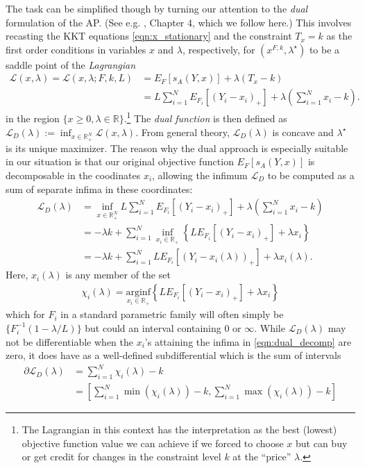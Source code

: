 \documentclass{article}
\begin{document}
The task can be simplified though by turning our attention to the \emph{dual} formulation of the AP. (See e.g. \cite{ruszczynski2011nonlinear}, Chapter 4, which we follow here.) This involves recasting the KKT equations \eqref{eqn:x_stationary}
and the constraint $T_x=k$ as the first order conditions in variables $x$ and $\lambda$, respectively, for $(x^{F,k}, \lambda^{\star})$ to be a saddle point of the \emph{Lagrangian}
\begin{align}{}
\mathcal{L}(x, \lambda) = \mathcal{L}(x, \lambda; F, k, L) 
&= E_F\left[s_A(Y,x)\right] + \lambda(T_x - k) \\
&= L\sum_{i=1}^{N} E_{F_i}[(Y_i - x_i)_{+}] + \lambda\left(\sum_{i=1}^{N} x_i - k\right).  
\end{align}
in the region $\{x \geq 0, \lambda \in \mathbb{R}\}$.\footnote{The Lagrangian in this context has the interpretation as the best (lowest) objective function value we can achieve if we forced to choose $x$ but can buy or get credit for changes in the constraint level $k$ 
at the ``price'' $\lambda$.}
The \emph{dual function} is then defined as $\mathcal{L}_D(\lambda) := \inf_{x \in \mathbb{R}_{+}^N} \mathcal{L}(x, \lambda)$. 
From general theory, $\mathcal{L}_D(\lambda)$ is concave and $\lambda^{\star}$ is its unique maximizer.
The reason why the dual approach is especially suitable in our situation is that 
our original objective function $E_F\left[s_A(Y,x)\right]$ is decomposable in the coodinates $x_i$, allowing the infimum
$\mathcal{L}_D$ to be computed as a sum of separate infima in these coordinates:
\begin{align}
\mathcal{L}_D(\lambda) &= \inf_{x \in \mathbb{R}_{+}^N} L\sum_{i=1}^{N} E_{F_i}[(Y_i - x_i)_{+}] + \lambda\left(\sum_{i=1}^{N} x_i - k\right) \\
&= - \lambda k + \sum_{i=1}^{N} \inf_{x_i \in \mathbb{R}_{+}}\left\{ L E_{F_i}[(Y_i - x_i)_{+}] + \lambda x_i\right\}  \label{eqn:dual_decomp} \\
&= - \lambda k + \sum_{i=1}^{N}  LE_{F_i}[(Y_i - x_i(\lambda))_{+}] + \lambda x_i(\lambda).
\end{align}
Here, $x_i(\lambda)$ is any member of the set 
\begin{align}
\chi_i(\lambda) = \underset{x_i \in \mathbb{R}_{+}}{\mathrm{arginf}} \left\{ L E_{F_i}[(Y_i - x_i)_{+}] + \lambda x_i\right\}
\end{align}
which for $F_i$ in a standard parametric family will often simply be $\{F_i^{-1}(1-\lambda/L)\}$ but could an interval containing $0$ or $\infty$.
While $\mathcal{L}_D(\lambda)$ may not be differentiable when the $x_i$'s attaining the infima in \eqref{eqn:dual_decomp} are zero, it does have as a well-defined subdifferential which is the sum of intervals
\begin{align}
\partial \mathcal{L}_D(\lambda) 
&= \sum_{i=1}^N \chi_i(\lambda) - k \\
&= \left[ \sum_{i=1}^N \min(\chi_i(\lambda))  - k, \sum_{i=1}^N \max(\chi_i(\lambda))  - k\right]
\end{align}
\end{document}
